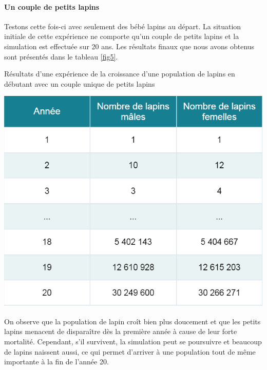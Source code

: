 \documentclass[12pt]{article}
\begin{document}
    \paragraph{Un couple de petits lapins}\hspace{0.5cm}
    \newline
    \par Testons cette fois-ci avec seulement des bébé lapins au départ. La situation initiale de cette expérience ne comporte qu'un couple de petits lapins et la simulation est effectuée sur 20 ans. Les résultats finaux que nous avons obtenus sont présentés dans le tableau \ref{fig5}.
    \begin{table}[!h]
	    \centering
	    \caption{Résultats d'une expérience de la croissance d'une population de lapins en débutant avec un couple unique de petits lapins}
        \includegraphics[scale = 0.7]{Photos/lapins1p.png}
	    \label{fig5}
	\end{table}
    \par
    On observe que la population de lapin croît bien plus doucement et que les petits lapins menacent de disparaître dès la première année à cause de leur forte mortalité. Cependant, s'il survivent, la simulation peut se poursuivre et beaucoup de lapins naissent aussi, ce qui permet d'arriver à une population tout de même importante à la fin de l'année 20.
\end{document}
